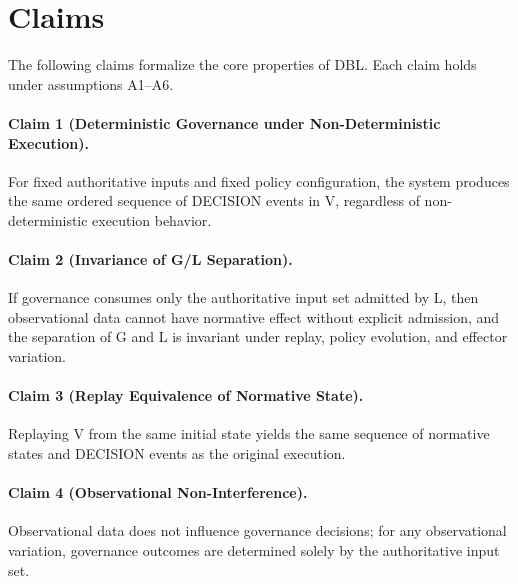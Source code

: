 \section{Claims}

The following claims formalize the core properties of DBL. Each claim holds under assumptions A1--A6.

\paragraph{Claim 1 (Deterministic Governance under Non-Deterministic Execution).}
For fixed authoritative inputs and fixed policy configuration, the system produces the same ordered sequence of DECISION events in V, regardless of non-deterministic execution behavior.

\paragraph{Claim 2 (Invariance of G/L Separation).}
If governance consumes only the authoritative input set admitted by L, then observational data cannot have normative effect without explicit admission, and the separation of G and L is invariant under replay, policy evolution, and effector variation.

\paragraph{Claim 3 (Replay Equivalence of Normative State).}
Replaying V from the same initial state yields the same sequence of normative states and DECISION events as the original execution.

\paragraph{Claim 4 (Observational Non-Interference).}
Observational data does not influence governance decisions; for any observational variation, governance outcomes are determined solely by the authoritative input set.
